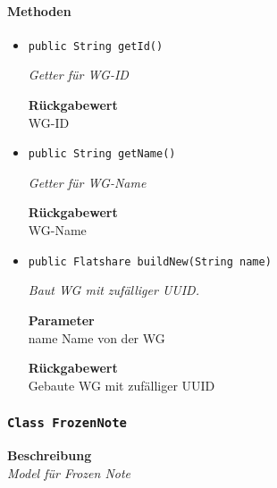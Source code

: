     \paragraph*{Methoden}
    \begin{itemize}
    	\item{\texttt{public String getId()}}
    	
    	\textit{Getter für WG-ID}
    	
    	
    	
    	\textbf{Rückgabewert} \\
    	WG-ID        \item{\texttt{public String getName()}}
    	
    	\textit{Getter für WG-Name}
    	
    	
    	
    	\textbf{Rückgabewert} \\
    	WG-Name        \item{\texttt{public Flatshare buildNew(String name)}}
    	
    	\textit{Baut WG mit zufälliger UUID.}
    	
    	\textbf{Parameter} \\
    	name Name von der WG
    	
    	\textbf{Rückgabewert} \\
    	Gebaute WG mit zufälliger UUID
    \end{itemize}
    \subsubsection{\texttt{Class FrozenNote}}
    \textbf{Beschreibung} \\
    \textit{Model für Frozen Note}
